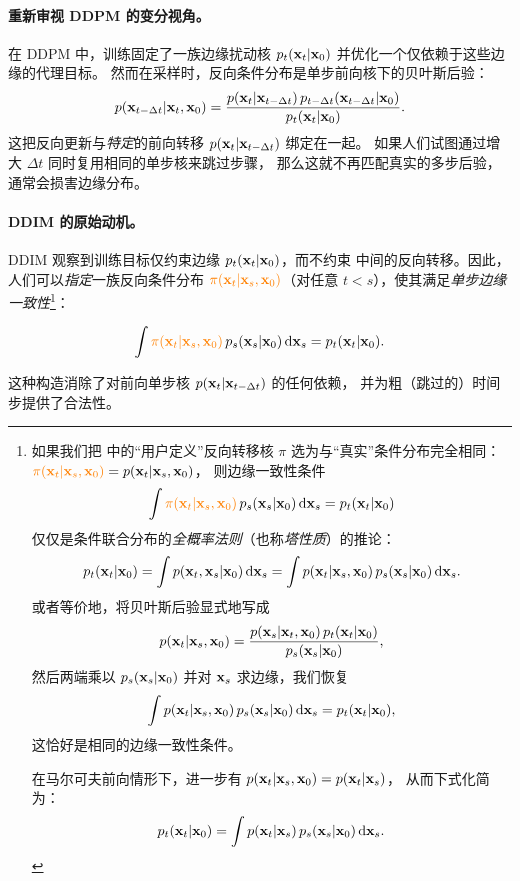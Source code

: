 \paragraph{重新审视 DDPM 的变分视角。}
在 DDPM 中，训练固定了一族边缘扰动核
$p_t({\mathbf{x}}_t|{\mathbf{x}}_0)$ 并优化一个仅依赖于这些边缘的代理目标。
然而在采样时，反向条件分布是单步前向核下的贝叶斯后验：
\[
p({\mathbf{x}}_{t-\Delta t}|{\mathbf{x}}_t,{\mathbf{x}}_0)
= \frac{p({\mathbf{x}}_t|{\mathbf{x}}_{t-\Delta t})\,p_{t-\Delta t}({\mathbf{x}}_{t-\Delta t}|{\mathbf{x}}_0)}
       {p_t({\mathbf{x}}_t|{\mathbf{x}}_0)}.
\]
这把反向更新与\emph{特定}的前向转移 $p({\mathbf{x}}_t|{\mathbf{x}}_{t-\Delta t})$ 绑定在一起。
如果人们试图通过增大 $\Delta t$ 同时复用相同的单步核来跳过步骤，
那么这就不再匹配真实的多步后验，通常会损害边缘分布。


\paragraph{DDIM 的原始动机。}
DDIM 观察到训练目标仅约束边缘 $p_t({\mathbf{x}}_t|{\mathbf{x}}_0)$，而不约束
中间的反向转移。因此，人们可以\emph{指定}一族反向条件分布
${\color{orange}\pi({\mathbf{x}}_t|{\mathbf{x}}_s,{\mathbf{x}}_0)}$（对任意 $t<s$），使其满足\emph{单步边缘一致性}\footnote{如果我们把  中的“用户定义”反向转移核
$\pi$ 选为与“真实”条件分布完全相同：
${\color{orange}\pi({\mathbf{x}}_t|{\mathbf{x}}_s,{\mathbf{x}}_0)} = p({\mathbf{x}}_t|{\mathbf{x}}_s, {\mathbf{x}}_0)$，
则边缘一致性条件
   \[
\int {\color{orange}\pi({\mathbf{x}}_t|{\mathbf{x}}_s,{\mathbf{x}}_0)}\,p_s({\mathbf{x}}_s|{\mathbf{x}}_0)\mathop{}\!\mathrm{d} {\mathbf{x}}_s
= p_t({\mathbf{x}}_t|{\mathbf{x}}_0)
\] 
仅仅是条件联合分布的\emph{全概率法则}（也称\emph{塔性质}）的推论：
\[
p_t({\mathbf{x}}_t|{\mathbf{x}}_0)
= \int p({\mathbf{x}}_t,{\mathbf{x}}_s|{\mathbf{x}}_0)\mathop{}\!\mathrm{d} {\mathbf{x}}_s
= \int p({\mathbf{x}}_t|{\mathbf{x}}_s,{\mathbf{x}}_0)\,p_s({\mathbf{x}}_s|{\mathbf{x}}_0)\mathop{}\!\mathrm{d} {\mathbf{x}}_s.
\]
或者等价地，将贝叶斯后验显式地写成
\[
p({\mathbf{x}}_t|{\mathbf{x}}_s,{\mathbf{x}}_0)
= \frac{p({\mathbf{x}}_s|{\mathbf{x}}_t,{\mathbf{x}}_0)\,p_t({\mathbf{x}}_t|{\mathbf{x}}_0)}
       {p_s({\mathbf{x}}_s|{\mathbf{x}}_0)},
\]
然后两端乘以 $p_s({\mathbf{x}}_s|{\mathbf{x}}_0)$ 并对 ${\mathbf{x}}_s$ 求边缘，我们恢复
\[
\int p({\mathbf{x}}_t|{\mathbf{x}}_s,{\mathbf{x}}_0)\,p_s({\mathbf{x}}_s|{\mathbf{x}}_0) \mathop{}\!\mathrm{d} {\mathbf{x}}_s
= p_t({\mathbf{x}}_t|{\mathbf{x}}_0),
\]
这恰好是相同的边缘一致性条件。

在马尔可夫前向情形下，进一步有
$p({\mathbf{x}}_t|{\mathbf{x}}_s,{\mathbf{x}}_0)=p({\mathbf{x}}_t|{\mathbf{x}}_s)$，
从而下式化简为：
\[
p_t({\mathbf{x}}_t|{\mathbf{x}}_0)
= \int p({\mathbf{x}}_t|{\mathbf{x}}_s)\,p_s({\mathbf{x}}_s|{\mathbf{x}}_0)\mathop{}\!\mathrm{d} {\mathbf{x}}_s.
\]
}：
\begin{mdframed}
    \begin{align}\label{eq:ddim-reverse-kernel-def}
\int {\color{orange}\pi({\mathbf{x}}_t|{\mathbf{x}}_s,{\mathbf{x}}_0)}\,p_s({\mathbf{x}}_s|{\mathbf{x}}_0) \mathop{}\!\mathrm{d} {\mathbf{x}}_s
= p_t({\mathbf{x}}_t|{\mathbf{x}}_0).
\end{align}
\end{mdframed}
这种构造消除了对前向单步核 $p({\mathbf{x}}_t|{\mathbf{x}}_{t-\Delta t})$ 的任何依赖，
并为粗（跳过的）时间步提供了合法性。

